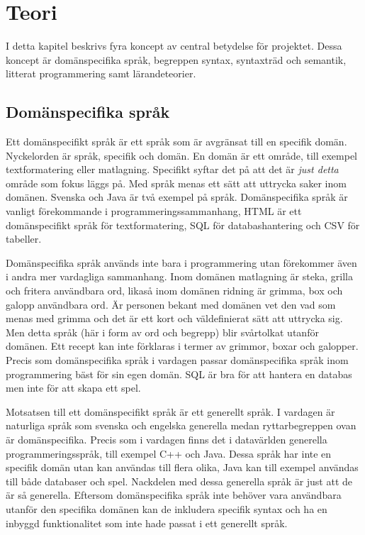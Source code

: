 
\chapter{Teori}

I detta kapitel beskrivs fyra koncept av central betydelse för projektet. Dessa
koncept är domänspecifika språk, begreppen syntax, syntaxträd och semantik,
litterat programmering samt lärandeteorier.

\section{Domänspecifika språk}

Ett domänspecifikt språk är ett språk som är avgränsat till en specifik domän.
Nyckelorden är språk, specifik och domän. En domän är ett område, till exempel
textformatering eller matlagning. Specifikt syftar det på att det är \textit{just
detta} område som fokus läggs på. Med språk menas ett sätt att uttrycka
saker inom domänen. Svenska och Java är två exempel på språk.
Domänspecifika språk är vanligt förekommande i programmeringssammanhang, HTML är
ett domänspecifikt språk för textformatering, SQL för databashantering och
CSV för tabeller.

Domänspecifika språk används inte bara i programmering utan förekommer även i
andra mer vardagliga sammanhang. Inom domänen matlagning är steka, grilla och
fritera användbara ord, likaså inom domänen ridning är grimma, box och galopp
användbara ord. Är personen bekant med domänen vet den vad som menas med grimma
och det är ett kort och väldefinierat sätt att uttrycka sig. Men detta språk (här
i form av ord och begrepp) blir svårtolkat utanför domänen. Ett recept kan inte
förklaras i termer av grimmor, boxar och galopper.
Precis som domänspecifika språk i vardagen passar
domänspecifika språk inom programmering bäst för sin egen domän. SQL är bra för
att hantera en databas men inte för att skapa ett spel.

Motsatsen till ett domänspecifikt språk är ett generellt språk. I
vardagen är naturliga språk som svenska och engelska generella medan
ryttarbegreppen ovan är domänspecifika. Precis som i vardagen finns
det i datavärlden generella programmeringsspråk, till exempel C++ och
Java. Dessa språk har inte en specifik domän utan kan användas till flera olika, Java kan till exempel användas till både databaser och spel. Nackdelen med
dessa generella språk är just att de är så generella. Eftersom
domänspecifika språk inte behöver vara användbara utanför den
specifika domänen kan de inkludera specifik syntax och ha en inbyggd
funktionalitet som inte hade passat i ett generellt språk.

